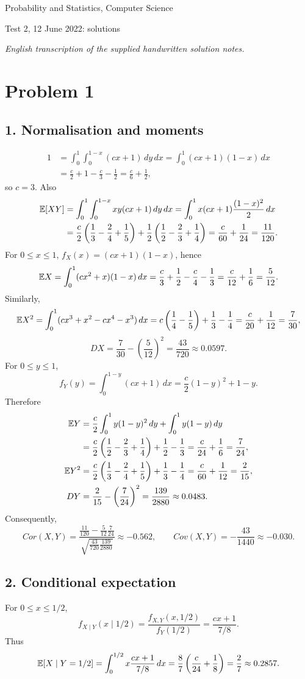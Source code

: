 \documentclass[a4paper]{article}
\begin{document}
\begin{center}\Large Probability and Statistics, Computer Science\par\large Test 2, 12 June 2022: solutions\end{center}
\noindent\textit{English transcription of the supplied handwritten solution notes.}
\section*{Problem 1}
\subsection*{1. Normalisation and moments}
\begin{align*}
1&=\int_0^1\int_0^{1-x}(cx+1)\,dy\,dx
=\int_0^1(cx+1)(1-x)\,dx\\
&=\frac c2+1-\frac c3-\frac12=\frac c6+\frac12,
\end{align*}
so $c=3$. Also
\begin{align*}
\mathbb {E}[XY]&=\int_0^1\int_0^{1-x}xy(cx+1)\,dy\,dx
=\int_0^1x(cx+1)\frac{(1-x)^2}{2}\,dx\\
&=\frac c2\left(\frac13-\frac24+\frac15\right)+\frac12\left(\frac12-\frac23+\frac14\right)
=\frac c{60}+\frac1{24}=\frac{11}{120}.
\end{align*}
For $0\le x\le1$, $f_X(x)=(cx+1)(1-x)$, hence
\[\mathbb {E} X=\int_0^1(cx^2+x)(1-x)\,dx
=\frac c3+\frac12-\frac c4-\frac13=\frac c{12}+\frac16=\frac5{12}.\]
Similarly,
\[\mathbb {E} X^2=\int_0^1(cx^3+x^2-cx^4-x^3)\,dx
=c\left(\frac14-\frac15\right)+\frac13-\frac14=\frac c{20}+\frac1{12}=\frac7{30},\]
\[DX=\frac7{30}-\left(\frac5{12}\right)^2=\frac{43}{720}\approx0.0597.\]
For $0\le y\le1$,
\[f_Y(y)=\int_0^{1-y}(cx+1)\,dx=\frac c2(1-y)^2+1-y.\]
Therefore
\begin{align*}
\mathbb {E} Y&=\frac c2\int_0^1y(1-y)^2\,dy+\int_0^1y(1-y)\,dy\\
&=\frac c2\left(\frac12-\frac23+\frac14\right)+\frac12-\frac13
=\frac c{24}+\frac16=\frac7{24},\\
\mathbb {E} Y^2&=\frac c2\left(\frac13-\frac24+\frac15\right)+\frac13-\frac14
=\frac c{60}+\frac1{12}=\frac2{15},\\
DY&=\frac2{15}-\left(\frac7{24}\right)^2=\frac{139}{2880}\approx0.0483.
\end{align*}
Consequently,
\[Cor(X,Y)=\frac{\frac{11}{120}-\frac5{12}\frac7{24}}{\sqrt{\frac{43}{720}\frac{139}{2880}}}\approx-0.562,\qquad Cov(X,Y)=-\frac{43}{1440}\approx-0.030.\]
\subsection*{2. Conditional expectation}
For $0\le x\le1/2$,
\[f_{X\mid Y}(x\mid1/2)=\frac{f_{X,Y}(x,1/2)}{f_Y(1/2)}=\frac{cx+1}{7/8}.\]
Thus
\[\mathbb {E}[X\mid Y=1/2]=\int_0^{1/2}x\frac{cx+1}{7/8}\,dx
=\frac87\left(\frac c{24}+\frac18\right)=\frac27\approx0.2857.\]
\end{document}
